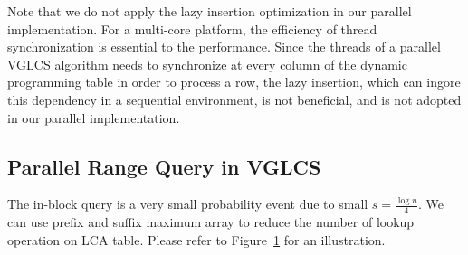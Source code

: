 Note that we do not apply the lazy insertion optimization in our
parallel implementation.  For a multi-core platform, the efficiency of
thread synchronization is essential to the performance.  Since the
threads of a parallel VGLCS algorithm needs to synchronize at every
column of the dynamic programming table in order to process a row, the
lazy insertion, which can ingore this dependency in a sequential
environment, is not beneficial, and is not adopted in our parallel
implementation.

\subsection{Parallel Range Query in VGLCS}





The in-block query is a very small probability event due to small $s =
\frac{\log n}{4}$. We can use prefix and suffix maximum array to
reduce the number of lookup operation on LCA table.  Please refer to
Figure~\ref{fig:compressed-sp-opt} for an illustration.

\begin{figure}[!thb]
  \centering {} 
  \label{fig:compressed-sp-opt}
\end{figure}

